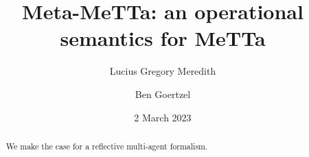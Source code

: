 \def\lastname{Meredith}

\title{Meta-MeTTa: an operational semantics for MeTTa}

\date{2 March 2023}

\author{ Lucius Gregory Meredith \\
         \and 
         Ben Goertzel
}
 

\maketitle              %


\begin{abstract}

  We make the case for a reflective multi-agent formalism.

\end{abstract}



